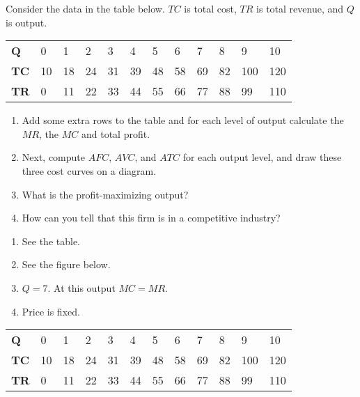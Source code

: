 \begin{enumialphparenastyle}
\begin{econex}
\begin{econsolution}
\end{econsolution}
\end{econex}

\begin{econex}\label{ex:ch9ex6}
Consider the data in the table below. $TC$ is total cost, $TR$ is total revenue, and $Q$ is output.
\begin{Table}{}
\begin{tabu} to \linewidth {|X[1,c]X[1,c]X[1,c]X[1,c]X[1,c]X[1,c]X[1,c]X[1,c]X[1,c]X[1,c]X[1,c]X[1,c]|}	\hline
{}	\textbf{Q}	&	0	&	1	&	2	&	3	&	4	&	5	&	6	&	7	&	8	&	9	&	10	\\
\textbf{TC}	&	10	&	18	&	24	&	31	&	39	&	48	&	58	&	69	&	82	&	100	&	120	\\
	\textbf{TR}	&	0	&	11	&	22	&	33	&	44	&	55	&	66	&	77	&	88	&	99	&	110	\\	\hline
\end{tabu}
\end{Table}
\begin{enumerate}
\item	Add some extra rows to the table and for each level of output calculate the $MR$, the $MC$ and total profit.
\item	Next, compute $AFC$, $AVC$, and $ATC$ for each output level, and draw these three cost curves on a diagram.
\item	What is the profit-maximizing output?
\item	How can you tell that this firm is in a competitive industry?
\end{enumerate}
\begin{econsolution}
\begin{enumerate}
\item	See the table.
\item	See the figure below.
\item	$Q=7$. At this output $MC=MR$.
\item	Price is fixed.
\end{enumerate}
\begin{Table}{}\footnotesize 
\begin{tabu} to \linewidth {|X[0.8,c]X[1,c]X[1,c]X[1,c]X[1,c]X[1,c]X[1,c]X[1,c]X[1,c]X[1,c]X[1,c]X[1,c]|}	\hline
		\textbf{Q}	&	0	&	1	&	2	&	3	&	4	&	5	&	6	&	7	&	8	&	9	&	10	\\
	\textbf{TC}	&	10	&	18	&	24	&	31	&	39	&	48	&	58	&	69	&	82	&	100	&	120	\\
		\textbf{TR}	&	0	&	11	&	22	&	33	&	44	&	55	&	66	&	77	&	88	&	99	&	110	\\

\end{tabu}
\end{Table}
\end{econsolution}
\end{econex}
\end{enumialphparenastyle}
